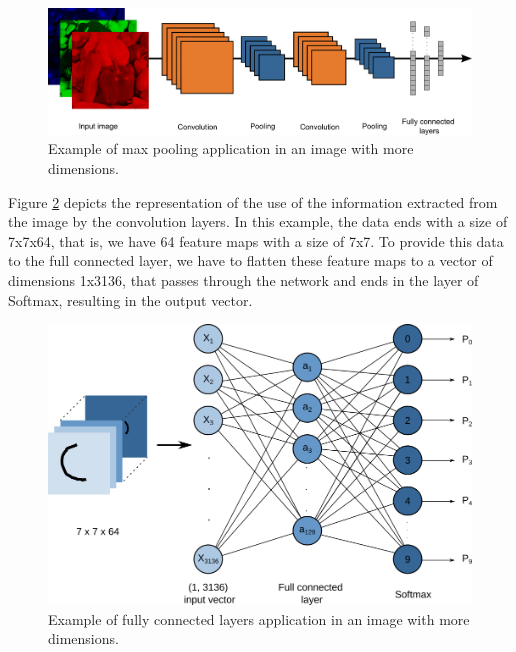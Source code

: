 \begin{figure}
    \centering
    \includegraphics[scale=0.22]{Part 3 - Learning Systems/Supervised Learning/Deep Learning/images/figure123.png}
    \caption{Example of max pooling application  in an image with more dimensions.}
    \label{fig:figure123}
\end{figure}

Figure \ref{fig:figure124} depicts the representation of the use of the information extracted from the image by the convolution layers. In this example, the data ends with a size of 7x7x64, that is, we have 64 feature maps with a size of 7x7. To provide this data to the full connected layer, we have to flatten these feature maps to a vector of dimensions 1x3136, that passes through the network and ends in the layer of Softmax, resulting in the output vector.

\begin{figure}
    \centering
    \includegraphics[scale=0.50]{Part 3 - Learning Systems/Supervised Learning/Deep Learning/images/figure124.png}
    \caption{Example of fully connected layers application in an image with more dimensions.}
    \label{fig:figure124}
\end{figure}

